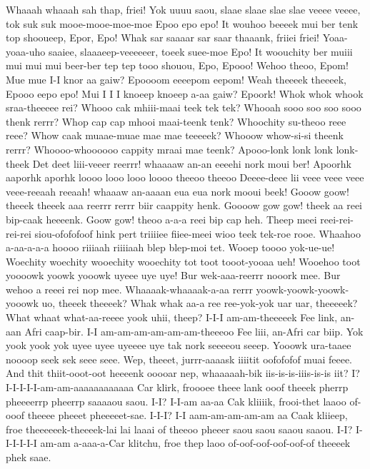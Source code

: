 \documentclass[12pt,a4paper]{article}
\begin{document}
\begin{drama}
\pistspeaks
Whaaah whaaah sah thap, friei! Yok uuuu saou, slaae slaae slae slae veeee veeee, tok suk suk mooe-mooe-moe-moe Epoo epo epo! It wouhoo beeeek mui ber tenk top shooueep, Epor, Epo! Whak sar saaaar sar saar thaaank, friiei friei! Yoaa-yoaa-uho saaiee, slaaaeep-veeeeeer, toeek suee-moe Epo! It woouchity ber muiii mui mui mui beer-ber tep tep tooo shouou, Epo, Epooo!
\euelspeaks
Wehoo theoo, Epom! Mue mue I-I knor aa gaiw? Epoooom eeeepom eepom! Weah theeeek theeeek, Epooo eepo epo! Mui I I I knoeep knoeep a-aa gaiw? Epoork!
\trocspeaks
Whok whok whook sraa-theeeee rei? Whooo cak mhiii-maai teek tek tek? Whooah sooo soo soo sooo thenk rerrr? Whop cap cap mhooi maai-teenk tenk? Whoochity su-theoo reee reee? Whow caak muaae-muae mae mae teeeeek? Whooow whow-si-si theenk rerrr? Whoooo-whoooooo cappity mraai mae teenk?
\pistspeaks
Apooo-lonk lonk lonk lonk-theek Det deet liii-veeer reerrr! whaaaaw an-an eeeehi nork moui ber! Apoorhk aaporhk aporhk loooo looo looo loooo theeoo theeoo Deeee-deee lii veee veee veee veee-reeaah reeaah! whaaaw an-aaaan eua eua nork mooui beek!
\trocspeaks
Gooow goow! theeek theeek aaa reerrr rerrr biir caappity henk. Goooow gow gow! theek aa reei bip-caak heeeenk. Goow gow! theoo a-a-a reei bip cap heh.
\euelspeaks
Theep meei reei-rei-rei-rei siou-ofofofoof hink pert triiiiee fiiee-meei wioo teek tek-roe rooe. Whaahoo a-aa-a-a-a hoooo riiiaah riiiiaah blep blep-moi tet.
\trocspeaks
Wooep toooo yok-ue-ue! Woechity woechity wooechity wooechity tot toot tooot-yooaa ueh! Wooehoo toot yoooowk yoowk yooowk uyeee uye uye!
\euelspeaks
Bur wek-aaa-reerrr nooork mee. Bur wehoo a reeei rei nop mee.
\trocspeaks
Whaaaak-whaaaak-a-aa rerrr yoowk-yoowk-yoowk-yooowk uo, theeek theeeek? Whak whak aa-a ree ree-yok-yok uar uar, theeeeek? What whaat what-aa-reeee yook uhii, theep?
\euelspeaks
I-I-I am-am-theeeeek Fee link, an-aan Afri caap-bir. I-I am-am-am-am-am-am-theeeoo Fee liii, an-Afri car biip.
\trocspeaks
Yok yook yook yok uyee uyee uyeeee uye tak nork seeeeou seeep. Yooowk ura-taaee noooop seek sek seee seee.
\euelspeaks
Wep, theeet, jurrr-aaaask iiiitit oofofofof muai feeee.
\trocspeaks
And thit thiit-ooot-oot heeeenk ooooar nep, whaaaaah-bik iis-is-is-iiis-is-is iit?
\pistspeaks
I? I-I-I-I-I-am-am-aaaaaaaaaaaa Car klirk, froooee theee lank ooof theeek pherrp pheeeerrp pheerrp saaaaou saou. I-I? I-I-am aa-aa Cak kliiiik, frooi-thet laaoo of-ooof theeee pheeet pheeeeet-sae. I-I-I? I-I aam-am-am-am-am aa Caak kliieep, froe theeeeeek-theeeek-lai lai laaai of theeoo pheeer saou saou saaou saaou. I-I? I-I-I-I-I-I am-am a-aaa-a-Car klitchu, froe thep laoo of-oof-oof-oof-oof-of theeeek phek saae.

\end{drama}
\end{document}
